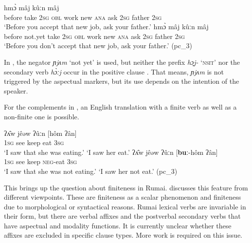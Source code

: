 \documentclass[output=paper,colorlinks,citecolor=brown]{langscibook}
\begin{document}
\ea\label{ex:rum:49}
    \ea\label{ex:rum:49a}
        	hmɔ̀	mâj	kûːn	mâj \\ 
             {\db}before take 2\textsc{sg} \textsc{obl} work new \textsc{ana} ask 2\textsc{sg} father 2\textsc{sg} \\
        \glt ‘Before you accept that new job, ask your father.’ 
    \ex\label{ex:rum:49b}
        	hmɔ̀	mâj	kûːn	mâj \\
             {\db}before not.yet take 2\textsc{sg} \textsc{obl} work new \textsc{ana} ask 2\textsc{sg} father 2\textsc{sg} \\
        \glt ‘Before you don’t accept that new job, ask your father.’ (pc\_3)
    \z
\z 

In , the negator \textit{ɲjʌm} ‘not yet’ is used, but neither the prefix \textit{hɔ̰j-} ‘\textsc{nsit’} nor the secondary verb \textit{hɔ̀ːj} occur in the positive clause . That means, \textit{ɲjʌm} is not triggered by the aspectual markers, but its use depends on the intention of the speaker.

For the complements in , an English translation with a finite verb as well as a non-finite one is possible. 

\ea\label{ex:rum:50}
    \ea\label{ex:rum:50a}
        \gll ʔʌ̂w	jêəw	ʔûːn	[hôm	ʔân] \\ 
             1\textsc{sg} see keep {\db}eat 3\textsc{sg} \\
        \glt ‘I saw that she was eating.’
        \glt ‘I saw her eat.’
    \ex\label{ex:rum:50b}
        \gll ʔʌ̂w	jêəw	ʔûːn	[\textbf{buː}-hôm	ʔân] \\
             1\textsc{sg} see keep {\db}\textsc{neg}{}-eat 3\textsc{sg} \\
        \glt ‘I saw that she was not eating.’
        \glt ‘I saw her not eat.’ (pc\_3)
    \z
\z 

This brings up the question about finiteness in Rumai. \citet{Bisang2001} discusses this feature from different viewpoints. These are finiteness as a scalar phenomenon and finiteness due to morphological or syntactical reasons. Rumai lexical verbs are invariable in their form, but there are verbal affixes and the postverbal secondary verbs that have aspectual and modality functions. It is currently unclear whether these affixes are excluded in specific clause types. More work is required on this issue.
\end{document}
